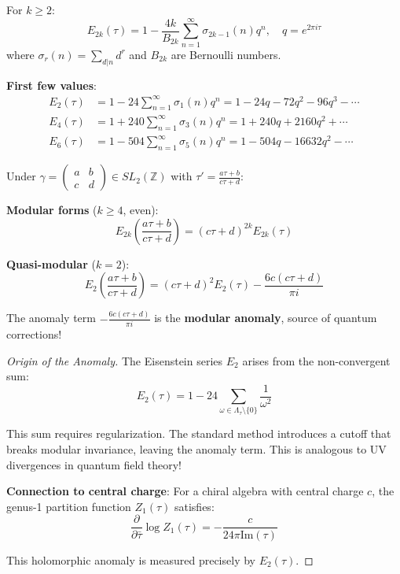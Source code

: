 \begin{definition}
\label{def:eisenstein}
For $k \geq 2$:
\begin{equation}
E_{2k}(\tau) = 1 - \frac{4k}{B_{2k}} \sum_{n=1}^{\infty} \sigma_{2k-1}(n) q^n, \quad q = e^{2\pi i \tau}
\end{equation}
where $\sigma_r(n) = \sum_{d|n} d^r$ and $B_{2k}$ are Bernoulli numbers.

\textbf{First few values}:
\begin{align}
E_2(\tau) &= 1 - 24\sum_{n=1}^{\infty} \sigma_1(n) q^n = 1 - 24q - 72q^2 - 96q^3 - \cdots \\
E_4(\tau) &= 1 + 240\sum_{n=1}^{\infty} \sigma_3(n) q^n = 1 + 240q + 2160q^2 + \cdots \\
E_6(\tau) &= 1 - 504\sum_{n=1}^{\infty} \sigma_5(n) q^n = 1 - 504q - 16632q^2 - \cdots
\end{align}
\end{definition}

\begin{theorem}
\label{thm:modular-vs-quasi}
Under $\gamma = \begin{pmatrix} a & b \\ c & d \end{pmatrix} \in SL_2(\mathbb{Z})$ with $\tau' = \frac{a\tau+b}{c\tau+d}$:

\textbf{Modular forms} ($k \geq 4$, even):
\begin{equation}
E_{2k}\left(\frac{a\tau+b}{c\tau+d}\right) = (c\tau + d)^{2k} E_{2k}(\tau)
\end{equation}

\textbf{Quasi-modular} ($k=2$):
\begin{equation}
E_2\left(\frac{a\tau+b}{c\tau+d}\right) = (c\tau + d)^2 E_2(\tau) - \frac{6c(c\tau+d)}{\pi i}
\end{equation}

The anomaly term $-\frac{6c(c\tau+d)}{\pi i}$ is the \textbf{modular anomaly}, source of quantum corrections!
\end{theorem}

\begin{proof}[Origin of the Anomaly]
The Eisenstein series $E_2$ arises from the non-convergent sum:
\begin{equation}
E_2(\tau) = 1 - 24\sum_{\omega \in \Lambda_\tau \setminus \{0\}} \frac{1}{\omega^2}
\end{equation}

This sum requires regularization. The standard method introduces a cutoff that breaks modular invariance,
leaving the anomaly term. This is analogous to UV divergences in quantum field theory!

\textbf{Connection to central charge}: For a chiral algebra with central charge $c$, the genus-1
partition function $Z_1(\tau)$ satisfies:
\begin{equation}
\frac{\partial}{\partial \bar{\tau}} \log Z_1(\tau) = -\frac{c}{24\pi \text{Im}(\tau)}
\end{equation}

This holomorphic anomaly is measured precisely by $E_2(\tau)$.
\end{proof}

